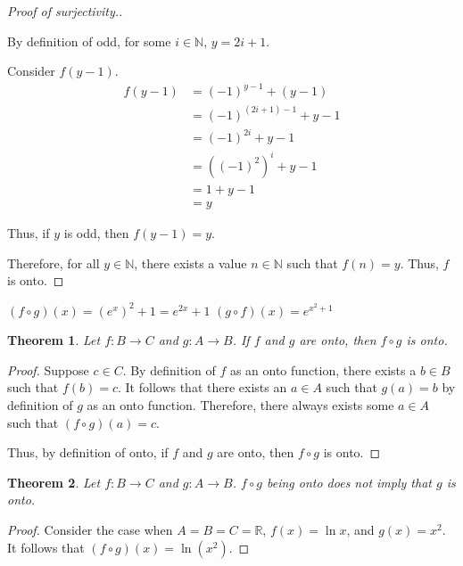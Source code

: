 \documentclass{article}
\newtheorem{theorem}{Theorem}
\begin{document}
\begin{outline}[enumerate]
\begin{proof}[Proof of surjectivity.]
\begin{adjustwidth}{0.5cm}{0.5cm}
            By definition of odd, for some $i \in \mathbb{N}$, $y = 2i + 1$.

            Consider $f(y - 1)$.
            \begin{equation}
                \begin{aligned}
                    f(y - 1) &= (-1)^{y - 1} + (y - 1) \\
                    &= (-1)^{(2i + 1) - 1} + y - 1 \\
                    &= (-1)^{2i} + y - 1 \\
                    &= ((-1)^2)^i + y - 1 \\
                    &= 1 + y - 1 \\
                    &= y
                \end{aligned}
            \end{equation}

            Thus, if $y$ is odd, then $f(y - 1) = y$.
        \end{adjustwidth}

        Therefore, for all $y \in \mathbb{N}$, there exists a value $n \in \mathbb{N}$ such that $f(n) = y$. Thus, $f$ is onto.
    \end{proof}

    \1 
        \2 $(f\circ g)(x) = (e^x)^2 + 1 = e^{2x} + 1$
        \2 $(g\circ f)(x) = e^{x^2 + 1}$
    \1 \begin{theorem}
        Let $f: B \rightarrow C$ and $g: A \rightarrow B$. If $f$ and $g$ are onto, then $f \circ g$ is onto.
    \end{theorem}
    \begin{proof}
        Suppose $c \in C$. By definition of $f$ as an onto function, there exists a $b \in B$ such that $f(b) = c$. It follows that there exists an $a \in A$ such that $g(a) = b$ by definition of $g$ as an onto function. Therefore, there always exists some $a \in A$ such that $(f \circ g)(a) = c$.

        Thus, by definition of onto, if $f$ and $g$ are onto, then $f \circ g$ is onto.
    \end{proof}
    \1
        \2 \begin{theorem}
            Let $f: B \rightarrow C$ and $g: A \rightarrow B$. $f \circ g$ being onto does not imply that $g$ is onto.
        \end{theorem}
        \begin{proof}
            Consider the case when $A = B = C = \mathbb{R}$, $f(x) = \ln x$, and $g(x) = x^2$. It follows that $(f \circ g)(x) = \ln(x^2)$.


\end{proof}
\end{outline}
\end{document}
